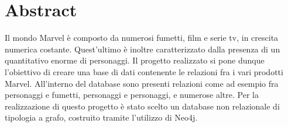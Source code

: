 \documentclass[
12pt, %
a4paper, %
oneside, %
headinclude,footinclude, %
BCOR5mm, %
]{scrartcl}
\title{\normalfont\spacedallcaps{Marvel Graph Database}} %
\author{\spacedlowsmallcaps{Fabrizio Cominetti, Davide Abete, Ruben Agazzi}} %
\date{} %
\begin{document}

\renewcommand{\sectionmark}[1]{\markright{\spacedlowsmallcaps{#1}}} %
\lehead{\mbox{\llap{\small\thepage\kern1em\color{halfgray} \vline}\color{halfgray}\hspace{0.5em}\rightmark\hfil}} %

\pagestyle{scrheadings} %


\maketitle %

\setcounter{tocdepth}{2} %

\tableofcontents %


\newpage
\section*{Abstract} %

Il mondo Marvel è composto da numerosi fumetti, film e serie tv, in crescita numerica costante. Quest'ultimo è inoltre caratterizzato dalla presenza di un quantitativo enorme di personaggi.
Il progetto realizzato si pone dunque l'obiettivo di creare una base di dati contenente le relazioni fra i vari prodotti Marvel. All'interno del database sono presenti relazioni come ad esempio fra personaggi e fumetti, personaggi e personaggi, e numerose altre. Per la realizzazione di questo progetto è stato scelto un database non relazionale di tipologia a grafo, costruito tramite l'utilizzo di Neo4j.
\end{document}

